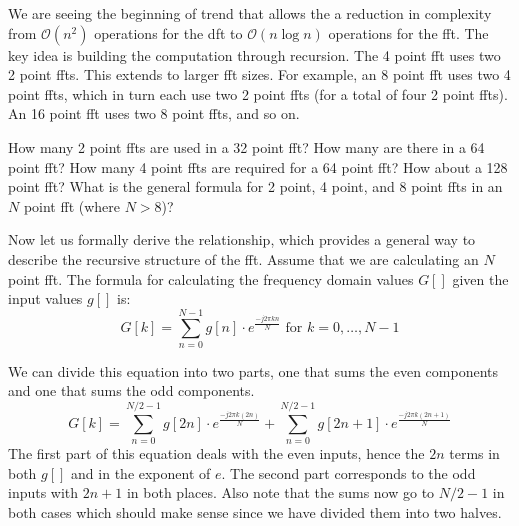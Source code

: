 We are seeing the beginning of trend that allows the a reduction in complexity from $\mathcal{O}(n^2)$ operations for the \gls{dft} to $\mathcal{O}(n \log n)$ operations for the \gls{fft}. The key idea is building the computation through recursion. The 4 point \gls{fft} uses two 2 point \gls{fft}s. This extends to larger \gls{fft} sizes. For example, an 8 point \gls{fft} uses two 4 point \gls{fft}s, which in turn each use two 2 point \gls{fft}s (for a total of four 2 point \gls{fft}s). An 16 point \gls{fft} uses two 8 point \gls{fft}s, and so on.

\begin{exercise}
How many 2 point \gls{fft}s are used in a 32 point \gls{fft}? How many are there in a 64 point \gls{fft}? How many 4 point \gls{fft}s are required for a 64 point \gls{fft}? How about a 128 point \gls{fft}?  What is the general formula for 2 point, 4 point, and 8 point \gls{fft}s in an $N$ point \gls{fft} (where $N > 8$)?
\end{exercise}

Now let us formally derive the relationship, which provides a general way to describe the recursive structure of the \gls{fft}.  Assume that we are calculating an $N$ point \gls{fft}. The formula for calculating the frequency domain values $G[]$ given the input values $g[]$ is:
\begin{equation}
G[k] = \displaystyle\sum\limits_{n=0}^{N-1} g[n] \cdot e^{\frac{-j 2 \pi k n}{N}} \text{ for } k = 0,\dots, N-1
\label{eq:fft-full}
\end{equation}

We can divide this equation into two parts, one that sums the even components and one that sums the odd components.
\begin{equation}
G[k] = \displaystyle\sum\limits_{n=0}^{N/2-1} g[2n] \cdot e^{\frac{-j 2 \pi k (2n)}{N}} + \displaystyle\sum\limits_{n=0}^{N/2-1} g[2n+1] \cdot e^{\frac{-j 2 \pi k (2n+1)}{N}}
\label{eq:fft-split}
\end{equation}
The first part of this equation deals with the even inputs, hence the $2n$ terms in both $g[]$ and in the exponent of $e$. The second part corresponds to the odd inputs with $2n +1$ in both places. Also note that the sums now go to $N/2 -1$ in both cases which should make sense since we have divided them into two halves. 

